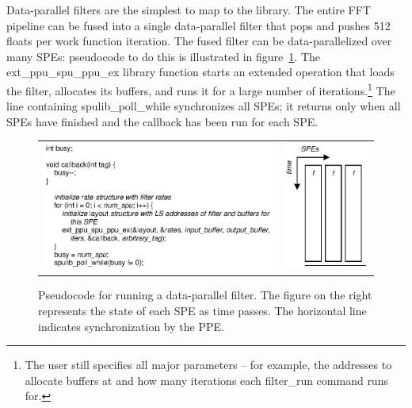 Data-parallel filters are the simplest to map to the library. The entire FFT pipeline can be fused into a single data-parallel filter that pops and pushes 512 floats per work function iteration. The fused filter can be data-parallelized over many SPEs: pseudocode to do this is illustrated in figure~\ref{fig:use:dp}. The \textsf{ext\_ppu\_spu\_ppu\_ex} library function starts an extended operation that loads the filter, allocates its buffers, and runs it for a large number of iterations.\footnote{The user still specifies all major parameters -- for example, the addresses to allocate buffers at and how many iterations each \textsf{filter\_run} command runs for.} The line containing \textsf{spulib\_poll\_while} synchronizes all SPEs; it returns only when all SPEs have finished and the callback has been run for each SPE.

\begin{figure}[!htb]
\begin{center}
\begin{tabular}{ll}
\includegraphics{figs/dpcode} & \includegraphics{figs/dp}
\end{tabular}
\end{center}
\caption[Pseudocode for running a data-parallel filter.]{Pseudocode for running a data-parallel filter. The figure on the right represents the state of each SPE as time passes. The horizontal line indicates synchronization by the PPE.}
\label{fig:use:dp}
\end{figure}

